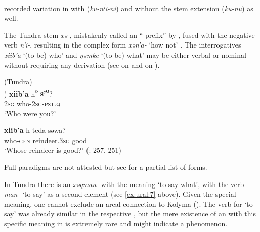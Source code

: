 \noindent \citet{Helimski1998} recorded  variation in  with (\textit{ku-n\textsuperscript{j}}\textit{i-ni}) and without the stem extension (\textit{ku-nu}) as well.

The Tundra   stem \textit{xə-}, mistakenly called an “ prefix” by \cite[3204f.]{Wagner-Nagy2016}, fused with the negative verb \textit{n’i-}, resulting in the complex form \textit{xə}\textit{n’a-} ‘how not’ \citep[281]{Nikolaeva2014}. The interrogatives \textit{xii}\textit{b’}\textit{a} ‘(to be) who’ and \textit{ŋəmke} ‘(to be) what’ may be either verbal or nominal without requiring any derivation (see  on  and  on ).

\ea%
    \label{ex:ural:17}
     (Tundra)\\
    \ea
    ) \textbf{{x}}\textbf{{ii}}\textbf{{b}}\textbf{{’}}\textbf{{a}}{-n}{\textsuperscript{o}}{-}\textbf{{s’}}\textbf{{\textsuperscript{o}}}?\\
    2\textsc{sg}    who-2\textsc{sg}-\textsc{pst}.\textsc{q}\\
    \glt ‘Who were you?’
    
    \ex
    \gll \textbf{{x}}\textbf{{ii}}\textbf{{b}}\textbf{{’}}\textbf{{a}}-h  teda    səwa?\\
    who-\textsc{gen}  reindeer.3\textsc{sg}  good\\
    \glt ‘Whose reindeer is good?’ (\citealt{Nikolaeva2014}: 257, 251)
    \z
    \z

\noindent Full paradigms are not attested but see \cite{Mus2009,Mus2015b} for a partial list of forms.

In Tundra  there is an  \textit{xəq}\textit{man-} with the meaning ‘to say what’, with the verb \textit{man-} ‘to say’ as a second element (see \ref{ex:ural:7} above). Given the special meaning, one cannot exclude an areal connection to Kolyma   (). The verb for ‘to say’ was already similar in the respective  \citep[274]{Nikolaeva2006}, but the mere existence of an  with this specific meaning in  is extremely rare and might indicate a  phenomenon.

